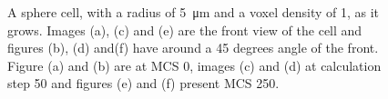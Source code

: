 \begin{figure}[ht]
\begin{center}
{	}
	\end{center}
	\caption[Growth of a sphere cell with a radius of 5]{\label{img:GrowthSphereCellRadius5}A sphere cell, with a radius of \SI{5}{\micro\metre} and a voxel density of 1, as it grows. Images (a), (c) and (e) are the front view of the cell and figures (b), (d) and(f) have around a 45 degrees angle of the front. Figure (a) and (b) are at \ac{MCS} 0, images (c) and (d) at calculation step 50 and figures (e) and (f) present \ac{MCS} 250.}
\end{figure}


